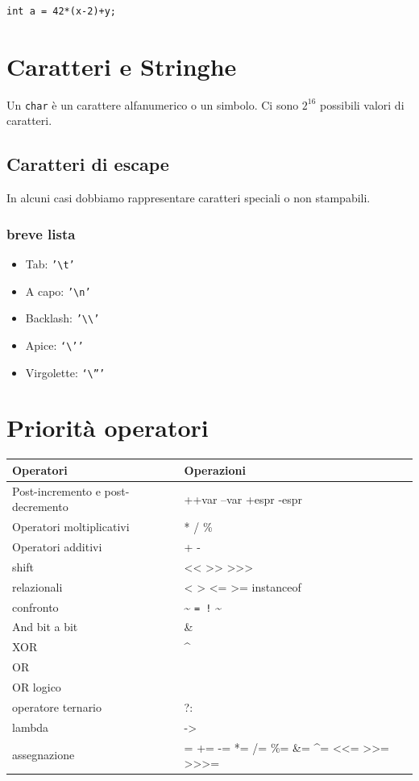 \documentclass[11pt]{article}
\begin{document}
\begin{verbatim}
int a = 42*(x-2)+y;

\end{verbatim}
\section{Caratteri e Stringhe}
\label{sec:orgb3852ea}
Un \texttt{char} è un carattere alfanumerico o un simbolo. Ci sono \(2^{16}\) possibili valori di caratteri.
\subsection{Caratteri di escape}
\label{sec:org35e8fde}
In alcuni casi dobbiamo rappresentare caratteri speciali o non stampabili.
\subsubsection{breve lista}
\label{sec:orgb8f9b73}
\begin{itemize}
\item Tab: \texttt{'\textbackslash{}t'}
\item A capo: \texttt{'\textbackslash{}n'}
\item Backlash: \texttt{'\textbackslash{}\textbackslash{}'}
\item Apice: \texttt{‘\textbackslash{}’’}
\item Virgolette: \texttt{‘\textbackslash{}”’}
\end{itemize}
\section{Priorità operatori}
\label{sec:org14cc343}
\begin{center}
\begin{tabular}{ll}
Operatori & Operazioni\\
\hline
Post-incremento e post-decremento & ++var --var +espr -espr\\
Operatori moltiplicativi & * / \%\\
Operatori additivi & + -\\
shift & << >> >>>\\
relazionali & < > <= >= instanceof\\
confronto & \textasciitilde{} \texttt{= !} \textasciitilde{}\\
And bit a bit & \&\\
XOR & \^{}\\
OR & \\
OR logico & \\
operatore ternario & ?:\\
lambda & ->\\
assegnazione & = += -= *= /= \%= \&= \^{}= <<= >>= >>>=\\
\end{tabular}
\end{center}
\end{document}
